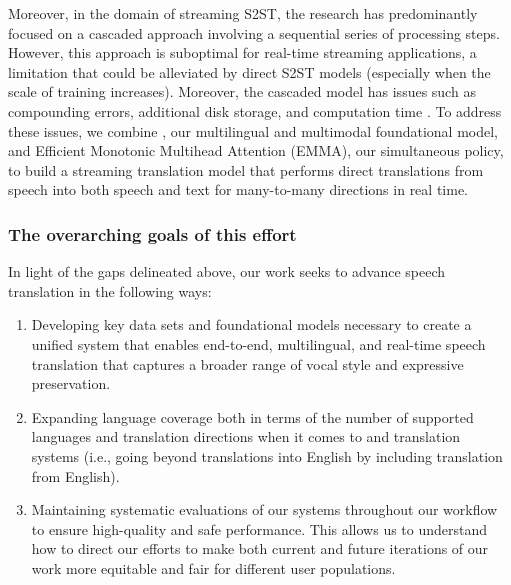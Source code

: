 Moreover, in the domain of streaming S2ST, the research has predominantly focused on a cascaded approach involving a sequential series of processing steps. 
However, this approach is suboptimal for real-time streaming applications, a limitation that could be alleviated by direct S2ST models (especially when the scale of training increases).
Moreover, the cascaded model has issues such as compounding errors, additional disk storage, and computation time \citep{bentivogli2021cascade,SeamlessM4TArXiv}.
To address these issues, we combine \mfourttwo, our multilingual and multimodal foundational model, and Efficient Monotonic Multihead Attention (EMMA), our simultaneous policy, to build a streaming translation model that performs direct translations from speech into
both speech and text for many-to-many directions in real time.


\subsubsection{The overarching goals of this effort}
In light of the gaps delineated above, our work seeks to advance speech translation in the following ways:
\begin{enumerate}
    \item Developing key data sets and foundational models necessary to create a unified system that enables end-to-end, multilingual, and real-time speech translation that captures a broader range of vocal style and expressive preservation. 
    \item Expanding language coverage both in terms of the number of supported languages and translation directions when it comes to \streaming and \expressive translation systems (i.e., going beyond translations into English by including translation from English).
    \item Maintaining systematic evaluations of our systems throughout our workflow to ensure high-quality and safe performance.
    This allows us to understand how to direct our efforts to make both current and future iterations of our work more equitable and fair for different user populations. %
\end{enumerate}


